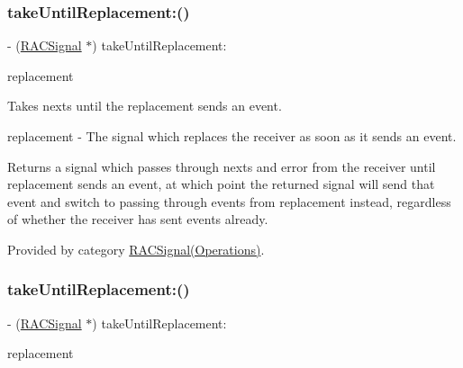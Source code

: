 \subsubsection{\texorpdfstring{take\+Until\+Replacement\+:()}{takeUntilReplacement:()}\hspace{0.1cm}{\footnotesize\ttfamily [1/3]}}
{\footnotesize\ttfamily -\/ (\mbox{\hyperlink{interface_r_a_c_signal}{R\+A\+C\+Signal}} $\ast$) take\+Until\+Replacement\+: \begin{DoxyParamCaption}\item[{(\mbox{\hyperlink{interface_r_a_c_signal}{R\+A\+C\+Signal}} $\ast$)}]{replacement }\end{DoxyParamCaption}}

Takes {\ttfamily next}s until the {\ttfamily replacement} sends an event.

replacement -\/ The signal which replaces the receiver as soon as it sends an event.

Returns a signal which passes through {\ttfamily next}s and {\ttfamily error} from the receiver until {\ttfamily replacement} sends an event, at which point the returned signal will send that event and switch to passing through events from {\ttfamily replacement} instead, regardless of whether the receiver has sent events already. 

Provided by category \mbox{\hyperlink{category_r_a_c_signal_07_operations_08_aa8536c9726338e10176997936be011ed}{R\+A\+C\+Signal(\+Operations)}}.

\mbox{\label{interface_r_a_c_signal_aa8536c9726338e10176997936be011ed}} 
\subsubsection{\texorpdfstring{take\+Until\+Replacement\+:()}{takeUntilReplacement:()}\hspace{0.1cm}{\footnotesize\ttfamily [2/3]}}
{\footnotesize\ttfamily -\/ (\mbox{\hyperlink{interface_r_a_c_signal}{R\+A\+C\+Signal}} $\ast$) take\+Until\+Replacement\+: \begin{DoxyParamCaption}\item[{(\mbox{\hyperlink{interface_r_a_c_signal}{R\+A\+C\+Signal}} $\ast$)}]{replacement }\end{DoxyParamCaption}}

